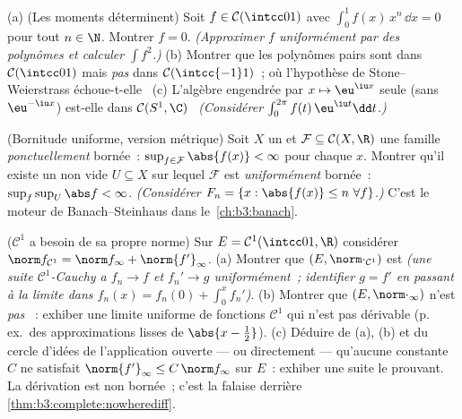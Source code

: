 \begin{exercise}[$\star\star$]\label{exo:b3:complete:9}
(a) (Les moments déterminent) Soit $f \in \mathcal
C(\intcc01)$ avec $\int_0^1 f(x)\,x^n\,\dd x = 0$ pour tout $n
\in \N$. Montrer $f = 0$. \emph{(Approximer $f$ uniformément
par des polynômes et calculer $\int f^2$.)}
(b) Montrer que les polynômes pairs sont  dans $\mathcal
C(\intcc01)$ mais \emph{pas} dans $\mathcal C(\intcc{-1}1)$~;
où l'hypothèse de Stone--Weierstrass échoue-t-elle~
(c) L'algèbre engendrée par $x \mapsto \eu^{\iu x}$ seule
(sans $\eu^{-\iu x}$) est-elle  dans $\mathcal C(S^1,
\C)$~ \emph{(Considérer $\int_0^{2\pi}f(t)\,\eu^{\iu t}\dd
t$.)}
\end{exercise}

\begin{exercise}[$\star\star\star$]\label{exo:b3:complete:10}
(Bornitude uniforme, version métrique) Soit $X$ un  et $\mathcal F \subseteq \mathcal C(X, \R)$
une famille \emph{ponctuellement} bornée~:
$\sup_{f \in \mathcal F}\abs{f(x)} < \infty$ pour chaque $x$.
Montrer qu'il existe un  non vide $U \subseteq X$ sur
lequel $\mathcal F$ est \emph{uniformément} bornée~:
$\sup_{f}\sup_U \abs f < \infty$.
\emph{(Considérer $F_n = \{x : \abs{f(x)} \leq n\ \forall
f\}$.)} C'est le moteur de Banach--Steinhaus dans
le~\cref{ch:b3:banach}.
\end{exercise}

\begin{exercise}[$\star\star$]\label{exo:b3:complete:11}
($\mathcal C^1$ a besoin de sa propre norme) Sur $E =
\mathcal C^1(\intcc01, \R)$ considérer $\norm f_{\mathcal C^1}
= \norm f_\infty + \norm{f'}_\infty$.
(a) Montrer que $(E, \norm\cdot_{\mathcal C^1})$ est 
\emph{(une suite $\mathcal C^1$-Cauchy a $f_n \to f$ et $f_n'
\to g$ uniformément~; identifier $g = f'$ en passant à la
limite dans $f_n(x) = f_n(0) + \int_0^xf_n'$)}.
(b) Montrer que $(E, \norm\cdot_\infty)$ n'est \emph{pas}
~: exhiber une limite uniforme de fonctions $\mathcal
C^1$ qui n'est pas dérivable (p.\,ex.\ des approximations
lisses de $\abs{x - \tfrac12}$).
(c) Déduire de (a), (b) et du cercle d'idées de l'application
ouverte --- ou directement --- qu'aucune constante $C$ ne
satisfait $\norm{f'}_\infty \leq C\,\norm f_\infty$ sur $E$~:
exhiber une suite le prouvant. La dérivation est non bornée~;
c'est la falaise derrière
\cref{thm:b3:complete:nowherediff}.
\end{exercise}

